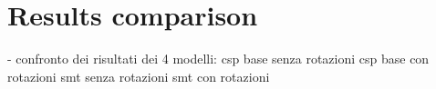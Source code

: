\section{Results comparison}
- confronto dei risultati dei 4 modelli: 
	csp base senza rotazioni
	csp base con rotazioni
	smt senza rotazioni
	smt con rotazioni
\clearpage